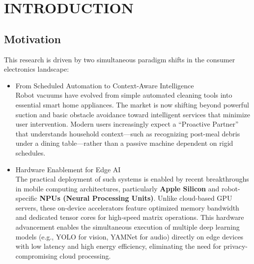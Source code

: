 \documentclass[conference]{IEEEtran}
\begin{document}
\section{INTRODUCTION}

\subsection{Motivation}
This research is driven by two simultaneous paradigm shifts in the consumer electronics landscape:

\begin{itemize}
    \item [1)] From Scheduled Automation to Context-Aware Intelligence \\
    Robot vacuums have evolved from simple automated cleaning tools into essential smart home appliances. The market is now shifting beyond powerful suction and basic obstacle avoidance toward intelligent services that minimize user intervention. Modern users increasingly expect a ``Proactive Partner'' that understands household context---such as recognizing post-meal debris under a dining table---rather than a passive machine dependent on rigid schedules.

    \item [2)] Hardware Enablement for Edge AI  \\
    The practical deployment of such systems is enabled by recent breakthroughs in mobile computing architectures, particularly \textbf{Apple Silicon} and robot-specific \textbf{NPUs (Neural Processing Units)}. Unlike cloud-based GPU servers, these on-device accelerators feature optimized memory bandwidth and dedicated tensor cores for high-speed matrix operations. This hardware advancement enables the simultaneous execution of multiple deep learning models (e.g., YOLO for vision, YAMNet for audio) directly on edge devices with low latency and high energy efficiency, eliminating the need for privacy-compromising cloud processing.
\end{itemize}
\end{document}
